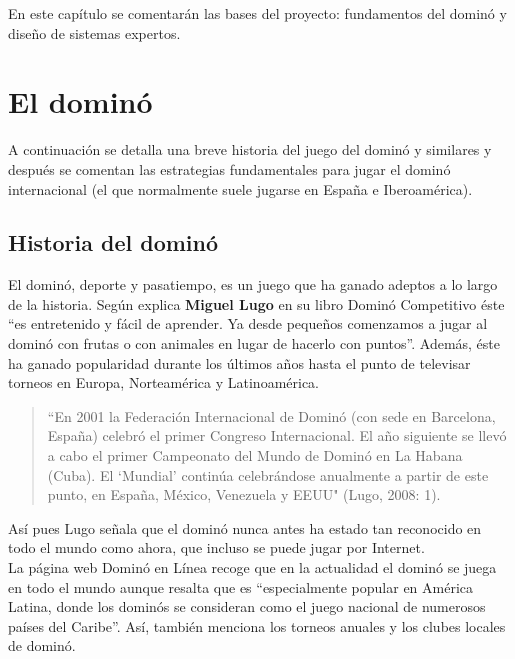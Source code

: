 

En este capítulo se comentarán las bases del proyecto: fundamentos del dominó y diseño de sistemas expertos.

\section{El dominó}

A continuación se detalla una breve historia del juego del dominó y similares y después se comentan las estrategias fundamentales para jugar el dominó internacional (el que normalmente suele jugarse en España e Iberoamérica).

\subsection{Historia del dominó}

El dominó, deporte y pasatiempo, es un juego que ha ganado adeptos a lo largo de la historia. Según explica \textbf{Miguel Lugo} en su libro Dominó Competitivo \cite{lugo08} éste “es entretenido y fácil de
aprender. Ya desde pequeños comenzamos a jugar al dominó con frutas o con animales en lugar de hacerlo
con puntos”. Además, éste ha ganado popularidad durante los últimos años hasta el punto de televisar
torneos en Europa, Norteamérica y Latinoamérica.

\begin{quote}
“En 2001 la Federación Internacional de Dominó (con sede en Barcelona, España) celebró el primer
Congreso Internacional. El año siguiente se llevó a cabo el primer Campeonato del Mundo de Dominó en La
Habana (Cuba). El ‘Mundial’ continúa celebrándose anualmente a partir de este punto, en España, México,
Venezuela y EEUU" (Lugo, 2008: 1).
\end{quote}

Así pues Lugo señala que el dominó nunca antes ha estado tan reconocido en todo el mundo como ahora, que
incluso se puede jugar por Internet. \\

La página web Dominó en Línea \cite{website:dominoenlinea} recoge que en la actualidad el dominó se juega en todo el
mundo aunque resalta que es “especialmente popular en América Latina, donde los dominós se consideran
como el juego nacional de numerosos países del Caribe”. Así, también menciona los torneos anuales y
los clubes locales de dominó.


